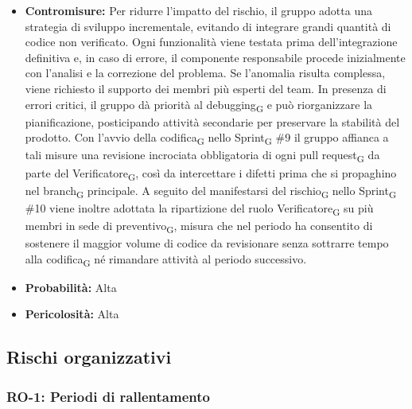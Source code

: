 ﻿\documentclass[a4paper, 10pt, colorlinks=true, linkcolor=black, urlcolor=blue, citecolor=blue, hidelinks]{article}
\begin{document}
\begin{itemize}
    \item \textbf{Contromisure:} Per ridurre l'impatto del rischio, il gruppo adotta una strategia di sviluppo incrementale, evitando di integrare grandi quantità di codice non verificato. Ogni funzionalità viene testata prima dell'integrazione definitiva e, in caso di errore, il componente responsabile procede inizialmente con l'analisi e la correzione del problema. Se l'anomalia risulta complessa, viene richiesto il supporto dei membri più esperti del team. In presenza di errori critici, il gruppo dà priorità al debugging\textsubscript{G} e può riorganizzare la pianificazione, posticipando attività secondarie per preservare la stabilità del prodotto. Con l'avvio della codifica\textsubscript{G} nello Sprint\textsubscript{G} \#9 il gruppo affianca a tali misure una revisione incrociata obbligatoria di ogni pull request\textsubscript{G} da parte del Verificatore\textsubscript{G}, così da intercettare i difetti prima che si propaghino nel branch\textsubscript{G} principale. A seguito del manifestarsi del rischio\textsubscript{G} nello Sprint\textsubscript{G} \#10 viene inoltre adottata la ripartizione del ruolo Verificatore\textsubscript{G} su più membri in sede di preventivo\textsubscript{G}, misura che nel periodo ha consentito di sostenere il maggior volume di codice da revisionare senza sottrarre tempo alla codifica\textsubscript{G} né rimandare attività al periodo successivo.

    \item \textbf{Probabilità:} Alta

    \item \textbf{Pericolosità:} Alta
\end{itemize}

\subsection{Rischi organizzativi}

\subsubsection{RO-1: Periodi di rallentamento}
\end{document}

